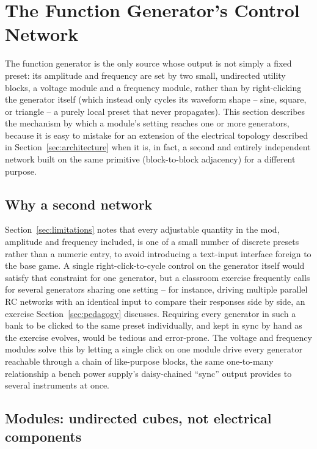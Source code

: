 \section{The Function Generator's Control Network}
\label{sec:control-network}

The function generator is the only source whose output is not simply a fixed preset: its
amplitude and frequency are set by two small, undirected utility blocks, a voltage module
and a frequency module, rather than by right-clicking the generator itself (which instead
only cycles its waveform shape -- sine, square, or triangle -- a purely local preset that
never propagates). This section describes the mechanism by which a module's setting reaches
one or more generators, because it is easy to mistake for an extension of the electrical
topology described in Section~\ref{sec:architecture} when it is, in fact, a second and
entirely independent network built on the same primitive (block-to-block adjacency) for a
different purpose.

\subsection{Why a second network}

Section~\ref{sec:limitations} notes that every adjustable quantity in the mod, amplitude and
frequency included, is one of a small number of discrete presets rather than a numeric
entry, to avoid introducing a text-input interface foreign to the base game. A single
right-click-to-cycle control on the generator itself would satisfy that constraint for one
generator, but a classroom exercise frequently calls for several generators sharing one
setting -- for instance, driving multiple parallel RC networks with an identical input to
compare their responses side by side, an exercise Section~\ref{sec:pedagogy} discusses.
Requiring every generator in such a bank to be clicked to the same preset individually, and
kept in sync by hand as the exercise evolves, would be tedious and error-prone. The voltage
and frequency modules solve this by letting a single click on one module drive every
generator reachable through a chain of like-purpose blocks, the same one-to-many relationship
a bench power supply's daisy-chained ``sync'' output provides to several instruments at once.

\subsection{Modules: undirected cubes, not electrical components}

